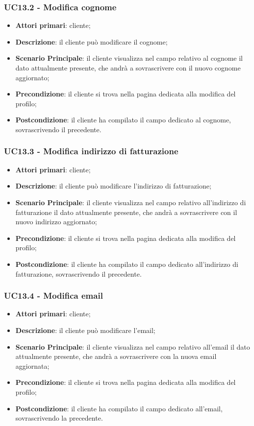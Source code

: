 \subsubsection{UC13.2 - Modifica cognome}
\begin{itemize}
\item \textbf{Attori primari}: cliente;
\item \textbf{Descrizione}: il cliente può modificare il cognome;
\item \textbf{Scenario Principale}: il cliente visualizza nel campo relativo al cognome il dato attualmente presente, che andrà a sovrascrivere con il nuovo cognome aggiornato;
\item \textbf{Precondizione}: il cliente si trova nella pagina dedicata alla modifica del profilo;
\item \textbf{Postcondizione}: il cliente ha compilato il campo dedicato al cognome, sovrascrivendo il precedente.
\end{itemize}

\subsubsection{UC13.3 - Modifica indirizzo di fatturazione}
\begin{itemize}
\item \textbf{Attori primari}: cliente;
\item \textbf{Descrizione}: il cliente può modificare l'indirizzo di fatturazione;
\item \textbf{Scenario Principale}: il cliente visualizza nel campo relativo all'indirizzo di fatturazione il dato attualmente presente, che andrà a sovrascrivere con il nuovo indirizzo aggiornato;
\item \textbf{Precondizione}: il cliente si trova nella pagina dedicata alla modifica del profilo;
\item \textbf{Postcondizione}: il cliente ha compilato il campo dedicato all'indirizzo di fatturazione, sovrascrivendo il precedente.
\end{itemize}

\subsubsection{UC13.4 - Modifica email}
\begin{itemize}
\item \textbf{Attori primari}: cliente;
\item \textbf{Descrizione}: il cliente può modificare l'email;
\item \textbf{Scenario Principale}: il cliente visualizza nel campo relativo all'email il dato attualmente presente, che andrà a sovrascrivere con la nuova email aggiornata;
\item \textbf{Precondizione}: il cliente si trova nella pagina dedicata alla modifica del profilo;
\item \textbf{Postcondizione}: il cliente ha compilato il campo dedicato all'email, sovrascrivendo la precedente.
\end{itemize}

